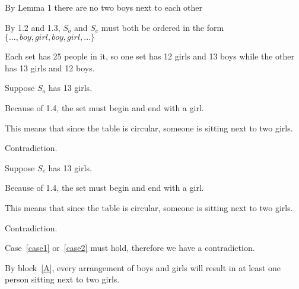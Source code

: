 \documentclass[11pt]{article}
\begin{document}
\begin{problems}
\begin{longFormProof}
\begin{block}[A]
        \vspace*{-1em}
        \hrulefill 
        \smallskip


    \step By Lemma 1 there are no two boys next to each other

    \step By 1.2 and 1.3, $S_o$ and $S_e$ must both be ordered in the form $\{..., boy, girl, boy, girl, ...\}$

    \step Each set has 25 people in it, so one set has 12 girls and 13 boys while the other has 13 girls and 12 boys.

    \begin{case}[case1]
    {Suppose $S_o$ has 13 girls.}

    \step Because of 1.4, the set must begin and end with a girl.

    \step This means that since the table is circular, someone is sitting next to two girls.

    \step Contradiction.

    \end{case}


    \begin{case}[case2]
    {Suppose $S_e$ has 13 girls.}

    \step Because of 1.4, the set must begin and end with a girl.

    \step This means that since the table is circular, someone is sitting next to two girls.

    \step Contradiction.

    \end{case}

    \step Case~\ref{case1} or~\ref{case2} must hold, therefore we have a contradiction.

    \end{block}

    \step By block~\ref{A}, every arrangement of boys and girls will result in at least one person sitting next to two girls.
  \end{longFormProof}


\end{problems}
\end{document}
